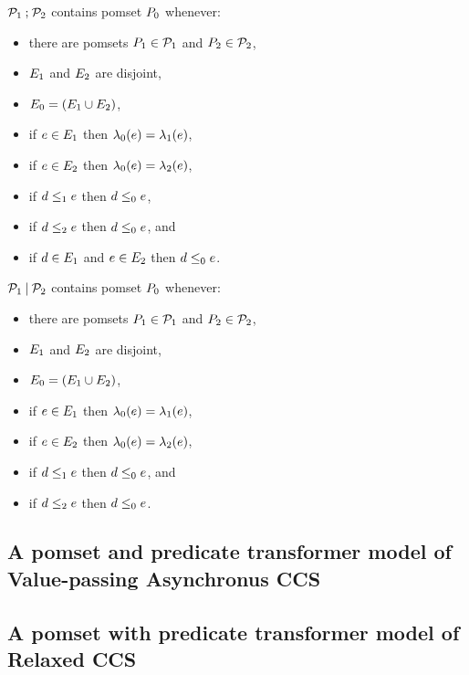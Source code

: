 \begin{definition}
  $\mathcal{P}_1\mathbin{;}\mathcal{P}_2$ contains pomset $P_0$ whenever:
  \begin{itemize}
  \item there are pomsets $P_1\in\mathcal{P}_1$ and $P_2\in\mathcal{P}_2$,
  \item $E_1$ and  $E_2$ are disjoint,
  \item $E_0 = (E_1\cup E_2)$,
  \item if $e\in E_1$ then $\lambda_0(e) = \lambda_1(e)$, 
  \item if $e\in E_2$ then $\lambda_0(e) = \lambda_2(e)$,
  \item if $d\le_1e$ then $d\le_0e$,
  \item if $d\le_2e$ then $d\le_0e$, and
  \item if $d\in E_1$ and $e\in E_2$ then $d\le_0e$.
  \end{itemize}
\end{definition}

\begin{definition}
  $\mathcal{P}_1\mathbin{\mid}\mathcal{P}_2$ contains pomset $P_0$ whenever:
  \begin{itemize}
  \item there are pomsets $P_1\in\mathcal{P}_1$ and $P_2\in\mathcal{P}_2$,
  \item $E_1$ and  $E_2$ are disjoint,
  \item $E_0 = (E_1\cup E_2)$,
  \item if $e\in E_1$ then $\lambda_0(e) = \lambda_1(e)$, 
  \item if $e\in E_2$ then $\lambda_0(e) = \lambda_2(e)$,
  \item if $d\le_1e$ then $d\le_0e$, and
  \item if $d\le_2e$ then $d\le_0e$.
  \end{itemize}
\end{definition}
  
\subsection{A pomset and predicate transformer model of Value-passing Asynchronus CCS}

\subsection{A pomset with predicate transformer model of Relaxed CCS}

